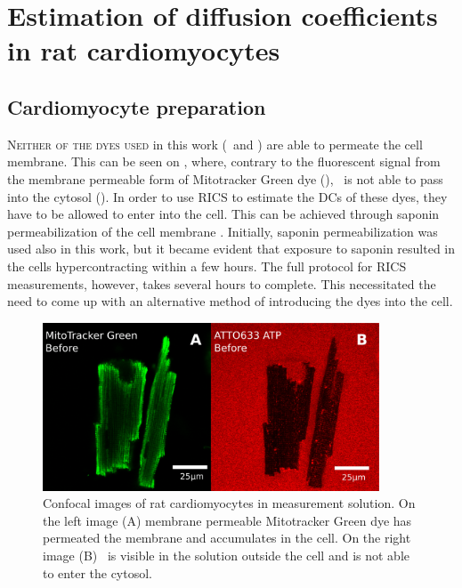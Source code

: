 \chapter{Estimation of diffusion coefficients in rat cardiomyocytes}
\label{ch:exp_res}
\section{Cardiomyocyte preparation}
\lettrine[lines=2, lhang=0.33, loversize=0.25]{N}
{either of the dyes used} in this work (\ATP\ and \DEX ) are able to permeate the cell
membrane. This can be seen on \F{\ref{fig:cells_1}}, where, contrary
to the fluorescent signal from the membrane permeable form of
Mitotracker Green dye (), \ATP\ is not
able to pass into the cytosol (). In order to use \ac{RICS} to estimate the \ac{DC}s of these
dyes, they have to be allowed to enter into the cell. This can be
achieved through saponin permeabilization of the cell membrane
\cite{Vendelin_08_AmJPhysiolCellPhysiol_295_pC1302}. Initially, saponin
permeabilization was used also in this work, but it
became evident that exposure to saponin resulted in the cells
hypercontracting within a few hours. The full protocol for \ac{RICS} measurements, however,
takes several hours to complete. This necessitated the need to come up with
an alternative method of introducing the dyes into the cell. 
\begin{figure}[h!]
  \centering
    \includegraphics[width=10cm]{figures/cells1.pdf}
    \caption[Non-permeated cardiomyocytes]{Confocal images of rat
    cardiomyocytes in measurement solution. On the left image (A)
    membrane permeable Mitotracker Green dye has permeated the membrane and accumulates in the cell. On the right image (B) \ATP\ is visible in the solution
    outside the cell and is not able to enter the cytosol.}
  \label{fig:cells_1}
\end{figure}
